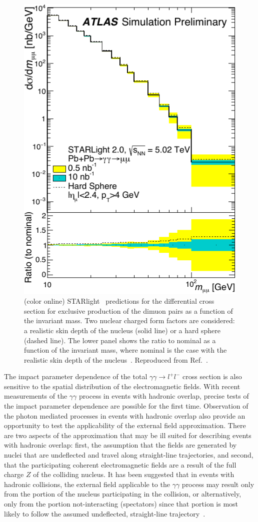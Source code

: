 \documentclass[12pt,epjc3]{svjour3}\sloppy
\begin{document}
\begin{figure}
  \centering
  \includegraphics[width=.4\textwidth]{fig/fig_8-crop.pdf}
  \caption{(color online) STARlight~\cite{kleinSTARlightMonteCarlo2017b} predictions for the differential cross section for exclusive production of the dimuon pairs as a function of the invariant mass. Two nuclear charged form factors are considered: a realistic skin depth of the nucleus (solid line) or a hard sphere (dashed line). The lower panel shows the ratio to nominal as a function of the invariant mass, where nominal is the case with the realistic skin depth of the nucleus~\cite{ProspectsMeasurementsPhotonInduced}. Reproduced from Ref.~\cite{ProspectsMeasurementsPhotonInduced}. }
  \label{fig:atlas_sim}
\end{figure}

The impact parameter dependence of the total $\gamma\gamma \rightarrow l^+l^-$ cross section is also sensitive to the spatial distribution of the electromagnetic fields. With recent measurements of the $\gamma\gamma$ process in events with hadronic overlap, precise tests of the impact parameter dependence are possible for the first time. Observation of the photon mediated processes in events with hadronic overlap also provide an opportunity to test the applicability of the external field approximation. There are two aspects of the approximation that may be ill suited for describing events with hadronic overlap: first, the assumption that the fields are generated by nuclei that are undeflected and travel along straight-line trajectories, and second, that the participating coherent electromagnetic fields are a result of the full charge $Z$ of the colliding nucleus. It has been suggested that in events with hadronic collisions, the external field applicable to the $\gamma\gamma$ process may result only from the portion of the nucleus participating in the collision, or alternatively, only from the portion not-interacting (spectators) since that portion is most likely to follow the assumed undeflected, straight-line trajectory~\cite{zhaCoherentEnsuremathPsi2018,starcollaborationObservationExcessPsi2019,alicecollaborationMeasurementExcessYield2016b}. 
\end{document}
